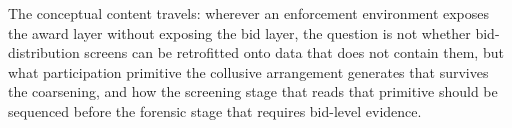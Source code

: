 The conceptual content travels: wherever an enforcement
environment exposes the award layer without exposing the bid
layer, the question is not whether bid-distribution screens can
be retrofitted onto data that does not contain them, but what
participation primitive the collusive arrangement generates that
survives the coarsening, and how the screening stage that reads
that primitive should be sequenced before the forensic stage
that requires bid-level evidence.
